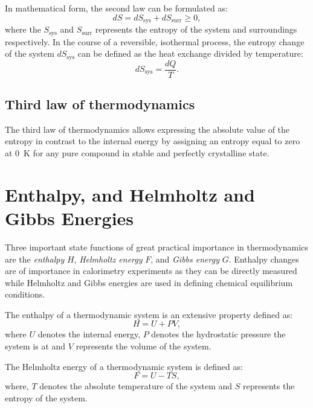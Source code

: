 In mathematical form, the second law can be formulated as:
\begin{equation}\label{eqn:slot}
    dS = dS_\text{sys} + dS_\text{surr} \geq 0,
\end{equation}
where the $S_\text{sys}$ and $S_\text{surr}$ represents the entropy of the system and surroundings respectively.
In the course of a reversible, isothermal process, the entropy change of the system $dS_\text{sys}$   can be defined as the heat exchange divided by temperature:
\begin{equation}\label{eqn:slotrev}
    dS_\text{sys} = \frac{dQ}{T}.
\end{equation}

\subsection{Third law of thermodynamics}
The third law of thermodynamics allows expressing the absolute value of the entropy in contrast to the internal energy by assigning an entropy equal to zero at \SI{0}{\kelvin} for any pure compound in stable and perfectly crystalline state.

\section{Enthalpy, and Helmholtz and Gibbs Energies}
    Three important state functions of great practical importance in thermodynamics are the \emph{enthalpy} $H$, \emph{Helmholtz energy} $F$, and \emph{Gibbs energy} $G$. Enthalpy changes are of importance in calorimetry experiments as they can be directly measured while Helmholtz and Gibbs energies are used in defining chemical equilibrium conditions.

    The enthalpy of a thermodynamic system is an extensive property defined as:
    \begin{equation}
        H = U + PV,
    \end{equation}
    where $U$ denotes the internal energy, $P$ denotes the hydrostatic pressure the system is at and $V$ represents the volume of the system.

    The Helmholtz energy of a thermodynamic system is defined as:
    \begin{equation}
        F = U - TS,
    \end{equation}
    where, $T$ denotes the absolute temperature of the system and $S$ represents the entropy of the system.

